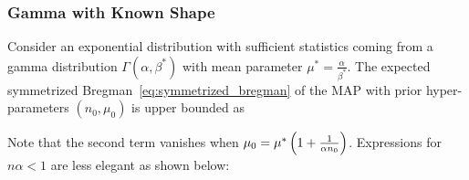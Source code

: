 \subsubsection{Gamma with Known Shape}
\label{app:proof-MAP-gamma}

\begin{theorem}
Consider an exponential distribution with sufficient statistics coming from a gamma distribution $\Gamma(\alpha, \beta^*)$ with mean parameter $\mu^* = \frac{\alpha}{\beta^*}$.
The expected symmetrized Bregman~\eqref{eq:symmetrized_bregman} of the MAP  with prior hyper-parameters $(n_0,\mu_0)$ is upper bounded as
\end{theorem} 
Note that the second term vanishes when $\mu_0 = \mu^* \left(1 + \frac{1}{\alpha n_0}\right)$.
Expressions for $n\alpha < 1$ are less elegant as shown below:

